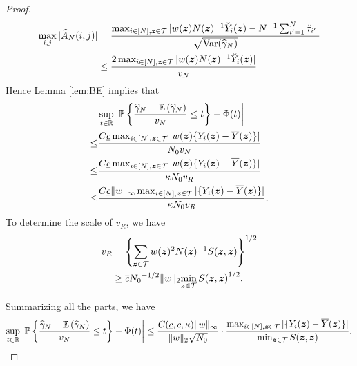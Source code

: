 \documentclass[12pt]{article}
\begin{document}
\begin{proof}
\begin{align*}
    \max_{i,j} |\widehat{A}_N(i,j)| &= 
    \frac{\max_{i\in[N],{\boldsymbol{z}}\in{\mathcal{T}}} |w({\boldsymbol{z}})N({\boldsymbol{z}})^{-1}\breve{Y}_i({\boldsymbol{z}}) - N^{-1}\sum_{i'=1}^N\breve{\tau}_{i'}| }{\sqrt{\operatorname{Var}({\widehat{\gamma}}_N)}}\\
    &\le \frac{2\max_{i\in[N],{\boldsymbol{z}}\in{\mathcal{T}}} |w({\boldsymbol{z}})N({\boldsymbol{z}})^{-1}\breve{Y}_i({\boldsymbol{z}})|}{v_N}
\end{align*}
Hence Lemma \ref{lem:BE} implies that
\begin{align*}
    &\sup_{t\in{\mathbb{R}}} \left|{\mathbb{P}}\left\{\frac{{\widehat{\gamma}}_N - {\mathbb{E}}\left({\widehat{\gamma}}_N\right)}{v_N}\le t\right\} - \Phi(t)\right|\\
    \le & \frac{C \underline{c}  \max_{i\in[N],{\boldsymbol{z}}\in{\mathcal{T}}}|w({\boldsymbol{z}}) \{Y_i({\boldsymbol{z}}) - \overline{Y}({\boldsymbol{z}})\}|}{N_0 v_N}\\
    \le & \frac{C \underline{c} \max_{i\in[N],{\boldsymbol{z}}\in{\mathcal{T}}}|w({\boldsymbol{z}}) \{Y_i({\boldsymbol{z}}) - \overline{Y}({\boldsymbol{z}})\}|}{\kappa N_0 v_R}\\
    \le & \frac{C \underline{c} \|w\|_\infty \max_{i\in[N],{\boldsymbol{z}}\in{\mathcal{T}}}|\{Y_i({\boldsymbol{z}}) - \overline{Y}({\boldsymbol{z}})\}|}{\kappa N_0 v_R}.
\end{align*}
To determine the scale of $v_R$, we have 
\begin{align*}
    {v}_R &= \left\{\sum_{{\boldsymbol{z}}\in{\mathcal{T}}} w({\boldsymbol{z}})^2N({\boldsymbol{z}})^{-1}{S}({\boldsymbol{z}},{\boldsymbol{z}})\right\}^{1/2} \\
    &\ge \overline{c} {N_0}^{-1/2} \|w\|_2 {\min_{{\boldsymbol{z}}\in{\mathcal{T}}}S({\boldsymbol{z}},{\boldsymbol{z}})}^{1/2}. 
\end{align*}
 
Summarizing all the parts, we have
\begin{align*}
    \sup_{t\in{\mathbb{R}}} \left|{\mathbb{P}}\left\{\frac{{\widehat{\gamma}}_N - {\mathbb{E}}\left({\widehat{\gamma}}_N\right)}{v_N}\le t\right\} - \Phi(t)\right| \le \frac{C(\underline{c}, \overline{c}, \kappa) \|w\|_\infty }{\|w\|_2\sqrt{N_0}}\cdot \frac{\max_{i\in[N],{\boldsymbol{z}}\in{\mathcal{T}}}|\{Y_i({\boldsymbol{z}}) - \overline{Y}({\boldsymbol{z}})\}|}{\min_{{\boldsymbol{z}}\in{\mathcal{T}}}S({\boldsymbol{z}},{\boldsymbol{z}})}.
\end{align*}
 

\end{proof}
\end{document}
